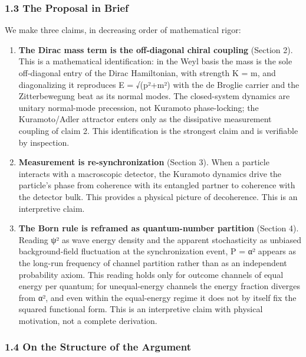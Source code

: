 \documentclass[
]{article}
\begin{document}
\subsubsection{1.3 The Proposal in Brief}\label{the-proposal-in-brief}

We make three claims, in decreasing order of mathematical rigor:

\begin{enumerate}
\def\labelenumi{\arabic{enumi}.}
\item
  \textbf{The Dirac mass term is the off-diagonal chiral coupling}
  (Section 2). This is a mathematical identification: in the Weyl basis
  the mass is the sole off-diagonal entry of the Dirac Hamiltonian, with
  strength K = m, and diagonalizing it reproduces E = √(p²+m²) with the
  de Broglie carrier and the Zitterbewegung beat as its normal modes.
  The closed-system dynamics are unitary normal-mode precession, not
  Kuramoto phase-locking; the Kuramoto/Adler attractor enters only as
  the dissipative measurement coupling of claim 2. This identification
  is the strongest claim and is verifiable by inspection.
\item
  \textbf{Measurement is re-synchronization} (Section 3). When a
  particle interacts with a macroscopic detector, the Kuramoto dynamics
  drive the particle's phase from coherence with its entangled partner
  to coherence with the detector bulk. This provides a physical picture
  of decoherence. This is an interpretive claim.
\item
  \textbf{The Born rule is reframed as quantum-number partition}
  (Section 4). Reading \textbar ψ\textbar² as wave energy density and
  the apparent stochasticity as unbiased background-field fluctuation at
  the synchronization event, P = \textbar α\textbar² appears as the
  long-run frequency of channel partition rather than as an independent
  probability axiom. This reading holds only for outcome channels of
  equal energy per quantum; for unequal-energy channels the energy
  fraction diverges from \textbar α\textbar², and even within the
  equal-energy regime it does not by itself fix the squared functional
  form. This is an interpretive claim with physical motivation, not a
  complete derivation.
\end{enumerate}

\subsubsection{1.4 On the Structure of the
Argument}\label{on-the-structure-of-the-argument}
\end{document}
